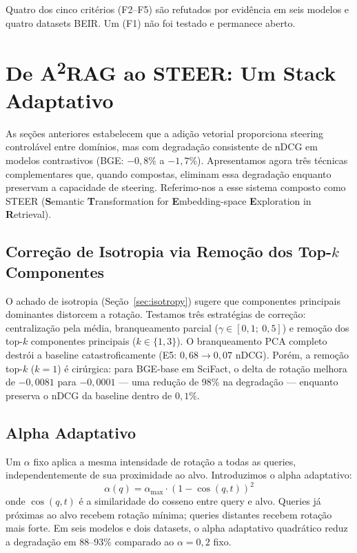 \documentclass{article}
\begin{document}
Quatro dos cinco critérios (F2--F5) são refutados por evidência em seis modelos e quatro datasets BEIR. Um (F1) não foi testado e permanece aberto.


\section{De A\textsuperscript{2}RAG ao STEER: Um Stack Adaptativo}
\label{sec:steer}

As seções anteriores estabelecem que a adição vetorial proporciona steering controlável entre domínios, mas com degradação consistente de nDCG em modelos contrastivos (BGE: $-0{,}8\%$ a $-1{,}7\%$). Apresentamos agora três técnicas complementares que, quando compostas, eliminam essa degradação enquanto preservam a capacidade de steering. Referimo-nos a esse sistema composto como STEER (\textbf{S}emantic \textbf{T}ransformation for \textbf{E}mbedding-space \textbf{E}xploration in \textbf{R}etrieval).

\subsection{Correção de Isotropia via Remoção dos Top-$k$ Componentes}

O achado de isotropia (Seção~\ref{sec:isotropy}) sugere que componentes principais dominantes distorcem a rotação. Testamos três estratégias de correção: centralização pela média, branqueamento parcial ($\gamma \in [0{,}1;\ 0{,}5]$) e remoção dos top-$k$ componentes principais ($k \in \{1, 3\}$). O branqueamento PCA completo destrói a baseline catastroficamente (E5: $0{,}68 \to 0{,}07$ nDCG). Porém, a remoção top-$k$ ($k=1$) é cirúrgica: para BGE-base em SciFact, o delta de rotação melhora de $-0{,}0081$ para $-0{,}0001$ --- uma redução de 98\% na degradação --- enquanto preserva o nDCG da baseline dentro de $0{,}1\%$.

\subsection{Alpha Adaptativo}

Um $\alpha$ fixo aplica a mesma intensidade de rotação a todas as queries, independentemente de sua proximidade ao alvo. Introduzimos o alpha adaptativo:
\begin{equation}
\alpha(q) = \alpha_{\max} \cdot \left(1 - \cos(q, t)\right)^2
\end{equation}
onde $\cos(q, t)$ é a similaridade do cosseno entre query e alvo. Queries já próximas ao alvo recebem rotação mínima; queries distantes recebem rotação mais forte. Em seis modelos e dois datasets, o alpha adaptativo quadrático reduz a degradação em 88--93\% comparado ao $\alpha = 0{,}2$ fixo.
\end{document}
